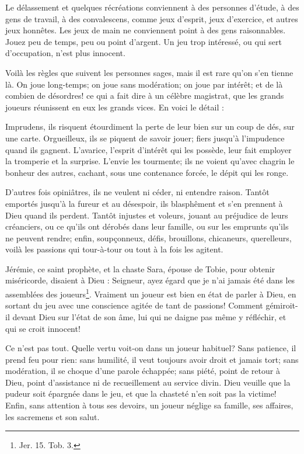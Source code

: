 \documentclass[instructions.tex]{subfiles}
\begin{document}
Le délassement et quelques récréations conviennent à des personnes d'étude, à des gens de travail, à des convalescens, comme jeux d'esprit, jeux d'exercice, et autres jeux honnêtes. Les jeux de main ne conviennent point à des gens raisonnables. Jouez peu de temps, peu ou point d'argent. Un jeu trop intéressé, ou qui sert d'occupation, n'est plus innocent.
 
Voilà les règles que suivent les personnes sages, mais il est rare qu'on s'en tienne là. On joue long-temps; on joue sans modération; on joue par intérêt; et de là combien de désordres! ce qui a fait dire à un célèbre magistrat, que les grands joueurs réunissent en eux les grands vices. En voici le détail :
 
Imprudens, ils risquent étourdiment la perte de leur bien sur un coup de dés, sur une carte. Orgueilleux, ils se piquent de savoir jouer; fiers jusqu'à l'impudence quand ils gagnent. L'avarice, l'esprit d'intérêt qui les possède, leur fait employer la tromperie et la surprise. L'envie les tourmente; ils ne voient qu'avec chagrin le bonheur des autres, cachant, sous une contenance forcée, le dépit qui les ronge.
 
D'autres fois opiniâtres, ils ne veulent ni céder, ni entendre raison. Tantôt emportés jusqu'à la fureur et au désespoir, ils blasphêment et s'en prennent à Dieu quand ils perdent. Tantôt injustes et voleurs, jouant au préjudice de leurs créanciers, ou ce qu'ils ont dérobés dans leur famille, ou sur les emprunts qu'ils ne peuvent rendre; enfin, soupçonneux, défis, brouillons, chicaneurs, querelleurs, voilà les passions qui tour-à-tour ou tout à la fois les agitent.
 
Jérémie, ce saint prophète, et la chaste Sara, épouse de Tobie, pour obtenir miséricorde, disaient à Dieu : Seigneur, ayez égard que je n'ai jamais été dans les assemblées des joueurs\footnote{Jer. 15. Tob. 3.}. Vraiment un joueur est bien en état de parler à Dieu, en sortant du jeu avec une conscience agitée de tant de passions! Comment gémiroit-il devant Dieu sur l'état de son âme, lui qui ne daigne pas même y réfléchir, et qui se croit innocent!
 
Ce n'est pas tout. Quelle vertu voit-on dans un joueur habituel? Sans patience, il prend feu pour rien: sans humilité, il veut toujours avoir droit et jamais tort; sans modération, il se choque d'une parole échappée; sans piété, point de retour à Dieu, point d'assistance ni de recueillement au service divin. Dieu veuille que la pudeur soit épargnée dans le jeu, et que la chasteté n'en soit pas la victime! Enfin, sans attention à tous ses devoirs, un joueur néglige sa famille, ses affaires, les sacremens et son salut.
 
\end{document}
